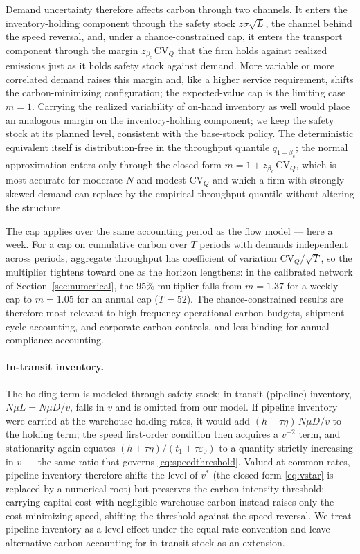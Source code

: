 \documentclass[11pt]{article}
\theoremstyle{definition}
\theoremstyle{remark}
\theoremstyle{plain}
\begin{document}
\noindent Demand uncertainty therefore affects carbon through two channels. It enters the inventory-holding component through the safety stock
$z\sigma\sqrt{L}$, the channel behind the speed reversal, and, under a chance-constrained cap, it enters the
transport component through the margin $z_{\beta_c}\,\mathrm{CV}_Q$ that the firm holds against realized emissions
just as it holds safety stock against demand. More variable or more correlated demand raises this margin and,
like a higher service requirement, shifts the carbon-minimizing configuration; the expected-value cap is the
limiting case $m=1$. Carrying the realized variability of on-hand inventory as well would place an analogous
margin on the inventory-holding component; we keep the safety stock at its planned level, consistent with the base-stock
policy. The deterministic equivalent itself is distribution-free in the throughput quantile $q_{1-\beta_c}$;
the normal approximation enters only through the closed form $m=1+z_{\beta_c}\,\mathrm{CV}_Q$, which is most
accurate for moderate $N$ and modest $\mathrm{CV}_Q$ and which a firm with strongly skewed demand can replace
by the empirical throughput quantile without altering the structure.

The cap applies over the same accounting period as the flow model --- here a week. For a cap on cumulative
carbon over $T$ periods with demands independent across periods, aggregate throughput has coefficient of
variation $\mathrm{CV}_Q/\sqrt{T}$, so the multiplier tightens toward one as the horizon lengthens: in the
calibrated network of Section~\ref{sec:numerical}, the $95\%$ multiplier falls from $m=1.37$ for a weekly cap to $m=1.05$ for an annual
cap ($T=52$). The chance-constrained results are therefore most relevant to high-frequency operational
carbon budgets, shipment-cycle accounting, and corporate carbon controls, and less binding for annual
compliance accounting.

\paragraph{In-transit inventory.} The holding term is modeled through safety stock; in-transit (pipeline)
inventory, $N\mu L = N\mu D/v$, falls in $v$ and is omitted from our model. If pipeline inventory were carried at the warehouse
holding rates, it would add $(h+\tau\eta)\,N\mu D/v$ to the holding term; the speed first-order condition
then acquires a $v^{-2}$ term, and stationarity again equates $(h+\tau\eta)/(t_1+\tau\varepsilon_0)$ to a
quantity strictly increasing in $v$ --- the same ratio that governs \eqref{eq:speedthreshold}. Valued at
common rates, pipeline inventory therefore shifts the level of $v^*$ (the closed form \eqref{eq:vstar} is
replaced by a numerical root) but preserves the carbon-intensity threshold; carrying capital cost with
negligible warehouse carbon instead raises only the cost-minimizing speed, shifting the threshold against
the speed reversal. We treat pipeline inventory as a level effect under the equal-rate convention and leave
alternative carbon accounting for in-transit stock as an extension.
\end{document}
